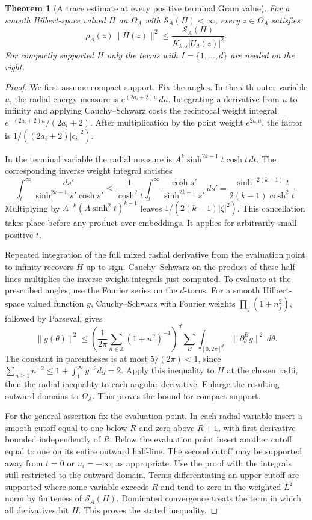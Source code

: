 \documentclass[a4paper,11pt]{article}
\newtheorem{theorem}[proposition]{Theorem}
\theoremstyle{definition}
\theoremstyle{remark}
\numberwithin{equation}{section}
\begin{document}
\begin{theorem}[A trace estimate at every positive terminal Gram value]
\leavevmode\label{thm:hardycell615}
For a smooth Hilbert-space valued \(H\) on \(\Omega_A\) with
\(\mathcal S_A(H)<\infty\), every \(z\in\Omega_A\) satisfies
\[
 \rho_A(z)\|H(z)\|^2
      \le \frac{\mathcal S_A(H)}{K_{k,s}|U_d(z)|^2}.
\]
For compactly supported \(H\) only the terms with
\(I=\{1,\ldots,d\}\) are needed on the right.
\end{theorem}
\begin{proof}
We first assume compact support. Fix the angles. In the
\(i\)-th outer variable \(u\), the radial energy measure is
\(e^{(2a_i+2)u}\,du\). Integrating a derivative from \(u\) to
infinity and applying Cauchy--Schwarz costs the reciprocal
weight integral \(e^{-(2a_i+2)u}/(2a_i+2)\). After multiplication
by the point weight \(e^{2a_i u}\), the factor is
\(1/((2a_i+2)|c_i|^2)\).

In the terminal variable the radial measure is
\(A^k\sinh^{2k-1}t\cosh t\,dt\). The corresponding inverse
weight integral satisfies
\[
 \int_t^\infty\frac{ds'}{\sinh^{2k-1}s'\cosh s'}
 \le\frac1{\cosh^2t}\int_t^\infty
                   \frac{\cosh s'}{\sinh^{2k-1}s'}\,ds'
 =\frac{\sinh^{-2(k-1)}t}{2(k-1)\cosh^2t}.
\]
Multiplying by \(A^{-k}(A\sinh^2t)^{k-1}\) leaves
\(1/(2(k-1)|\zeta|^2)\). This cancellation takes place before
any product over embeddings. It applies for arbitrarily small
positive \(t\).

Repeated integration of the full mixed radial derivative from
the evaluation point to infinity recovers \(H\) up to sign.
Cauchy--Schwarz on the product of these half-lines multiplies
the inverse weight integrals just computed. To evaluate at the
prescribed angles, use the Fourier series on the \(d\)-torus.
For a smooth Hilbert-space valued function \(g\), Cauchy--Schwarz
with Fourier weights \(\prod_j(1+n_j^2)\), followed by Parseval,
gives
\[
  \|g(\theta)\|^2\le
  \left(\frac{1}{2\pi}\sum_{n\in\mathbb Z}(1+n^2)^{-1}\right)^d
     \sum_B\int_{[0,2\pi]^d}\|\partial_\theta^B g\|^2\,d\theta .
\]
The constant in parentheses is at most \(5/(2\pi)<1\), since
\(\sum_{n\ge1}n^{-2}\le1+\int_1^\infty y^{-2}dy=2\). Apply this
inequality to \(H\) at the chosen radii, then the radial
inequality to each angular derivative. Enlarge the resulting
outward domains to \(\Omega_A\). This proves the bound for
compact support.

For the general assertion fix the evaluation point. In each
radial variable insert a smooth cutoff equal to one below \(R\)
and zero above \(R+1\), with first derivative bounded independently
of \(R\). Below the evaluation point insert another cutoff equal
to one on its entire outward half-line. The second cutoff may
be supported away from \(t=0\) or \(u_i=-\infty\), as appropriate.
Use the proof with the integrals still restricted to the outward
domain. Terms differentiating an upper cutoff are supported
where some variable exceeds \(R\) and tend to zero in the
weighted \(L^2\) norm by finiteness of \(\mathcal S_A(H)\).
Dominated convergence treats the term in which all derivatives
hit \(H\). This proves the stated inequality.
\end{proof}
\end{document}
